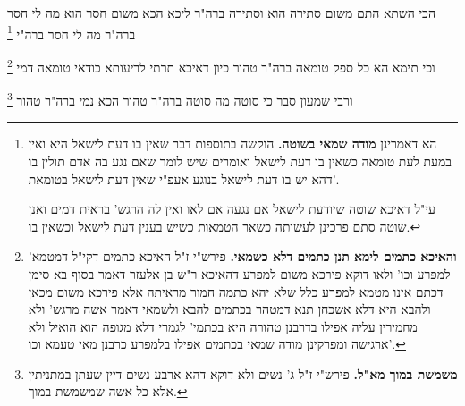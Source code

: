\documentclass[12pt, openany]{book}
\newcommand{\footnotecomment}[1]{\footnote{#1}}
\newcommand{\commenta}[1]{\footnotecomment{#1}}
\begin{document}
{הכי השתא  התם משום סתירה הוא וסתירה ברה"ר ליכא הכא משום חסר הוא מה לי חסר ברה"ר מה לי חסר ברה"י 
\commenta{ הא דאמרינן \textbf{מודה שמאי בשוטה.}  הוקשה בתוספות דבר שאין בו דעת לישאל היא ואין במעת לעת טומאה כשאין בו דעת לישאל ואומרים שיש לומר שאם נגע בה אדם תולין בו דהא יש בו דעת לישאל בנוגע אעפ"י שאין דעת לישאל בטומאת'.\par עי"ל דאיכא שוטה שיודעת לישאל אם נגעה אם לאו ואין לה הרגש' בראית דמים ואנן שוטה סתם פרכינן לעשותה כשאר הטמאות כשיש בענין דעת לישאל וכשאין בו. }

וכי תימא  הא כל ספק טומאה ברה"ר טהור  כיון דאיכא תרתי לריעותא כודאי טומאה דמי 
\commenta{\textbf{והאיכא כתמים לימא תנן כתמים דלא כשמאי.}  פירש"י ז"ל האיכא כתמים דקי"ל דמטמא' למפרע וכו' ולאו דוקא פירכא משום למפרע דהאיכא ר"ש בן אלעזר דאמר בסוף בא סימן דכתם אינו מטמא למפרע כלל שלא יהא כתמה חמור מראיתה אלא פירכא משום מכאן ולהבא היא דלא אשכחן תנא דמטהר בכתמים להבא ולשמאי דאמר אשה מרגש' ולא מחמירין עליה אפילו בדרבנן טהורה היא בכתמי' לגמרי דלא מגופה הוא הואיל ולא ארגישה ומפרקינן מודה שמאי בכתמים אפילו בלמפרע כרבנן מאי טעמא וכו'. }

ורבי שמעון סבר  כי סוטה מה סוטה ברה"ר טהור הכא נמי ברה"ר טהור 
\commenta{\textbf{משמשת במוך מא"ל.}  פירש"י ז"ל ג' נשים ולא דוקא דהא ארבע נשים דיין שעתן במתניתין אלא כל אשה שמשמשת במוך. }

}
\end{document}
